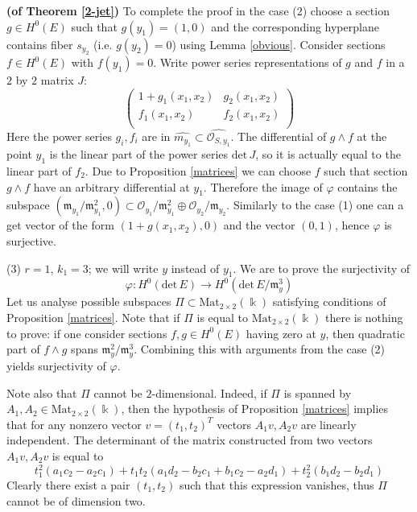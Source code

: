 \documentclass[10pt,a4paper]{amsart}
\renewenvironment{proof}[1]{\par\medskip\noindent\textbf{#1}\enspace\ignorespaces}{\par\medskip}
\begin{document}
\begin{proof}{(of Theorem \ref{2-jet})}
    To complete the proof in the case (2) choose a section $g \in H^0(E)$ such that $g(y_1) = (1, 0)$ and the corresponding hyperplane contains fiber $s_{y_2}$ (i.e. $g(y_2) = 0$) using Lemma \ref{obvious}.
    Consider sections $f \in H^0(E)$ with $f(y_1) = 0$. Write power series representations of $g$ and $f$ in a $2$ by $2$ matrix $J$:
    \begin{equation*}
        \begin{pmatrix}
            1+g_1(x_1,x_2)&g_2(x_1,x_2)\\
            f_1(x_1,x_2)  &f_2(x_1,x_2)\\
        \end{pmatrix}
    \end{equation*}
    Here the power series $g_i, f_i$ are in $\widehat{m_{y_1}} \subset \widehat{\mathcal O_{S, y_1}}$.
    The differential of $g\wedge f$ at the point $y_1$ is the linear part of the power series $\mathrm{det}\, J$, so it is actually equal to the linear part of $f_2$.
    Due to Proposition \ref{matrices} we can choose $f$ such that section $g\wedge f$ have an arbitrary differential at $y_1$.
    Therefore the image of $\varphi$ contains the subspace $(\mathfrak m_{y_1}/\mathfrak m_{y_1}^2, 0) \subset \mathcal O_{y_1} / \mathfrak m_{y_1}^2 \oplus \mathcal O_{y_2}/ \mathfrak m_{y_2}$.
    Similarly to the case (1) one can a get vector of the form $(1+ g(x_1, x_2), 0)$ and the vector $(0, 1)$, hence $\varphi$ is surjective.
    
    (3) $r=1$, $k_1=3$; we will write $y$ instead of $y_1$. We are to prove the surjectivity of
    \[
    \varphi \colon H^0(\mathrm{det}\, E) \to H^0(\mathrm{det} \,E/ \mathfrak m_{y}^3)
    \]
    Let us analyse possible subspaces $\Pi \subset \mathrm{Mat}_{2 \times 2}(\Bbbk)$ satisfying conditions of Proposition \ref{matrices}.
    Note that if $\Pi$ is equal to $\mathrm{Mat}_{2 \times 2}(\Bbbk)$ there is nothing to prove: if one consider sections $f, g \in H^0(E)$ having zero at $y$, then quadratic part of $f\wedge g$ spans $\mathfrak m_y^2/\mathfrak m_y^3$.
    Combining this with arguments from the case (2) yields surjectivity of $\varphi$.
    
    Note also that $\Pi$ cannot be $2$-dimensional.
    Indeed, if $\Pi$ is spanned by $A_1, A_2 \in \mathrm{Mat}_{2 \times 2}(\Bbbk)$, then the hypothesis of Proposition \ref{matrices} implies that for any nonzero vector $v = (t_1, t_2)^T$ vectors $A_1 v, A_2 v$ are linearly independent.
    The determinant of the matrix constructed from two vectors $A_1 v, A_2 v$ is equal to
    \[
    t_1^2(a_1 c_2-a_2 c_1) +t_1 t_2 (a_1 d_2 - b_2 c_1 + b_1 c_2 - a_2 d_1) +t_2^2(b_1 d_2 - b_2 d_1)
    \]
    Clearly there exist a pair $(t_1, t_2)$ such that this expression vanishes, thus $\Pi$ cannot be of dimension two.


\end{proof}
\end{document}
